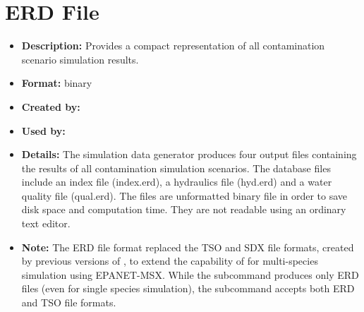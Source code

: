 \section{ERD File}\label{formats_tsoFile} 
\begin{itemize} 
\item {\bfseries Description:} Provides a compact representation of all contamination scenario simulation results. 
\item {\bfseries Format:} binary 
\item {\bfseries Created by:}  
\item {\bfseries Used by:}  
\item {\bfseries Details:} The simulation data generator produces four output files 
containing the results of all contamination simulation scenarios.  The database files include 
an index file (index.erd), a hydraulics file (hyd.erd) and a water quality file (qual.erd).  
The files are unformatted binary file in order to save disk space and computation time. 
They are not readable using an ordinary text editor.  
\item {\bfseries Note:} The ERD file format replaced the TSO and SDX file formats, created by previous versions of 
, to extend the capability of  for multi-species simulation using EPANET-MSX.  
While the  subcommand produces only ERD files 
(even for single species simulation), the  subcommand accepts both ERD and TSO file formats. 
\end{itemize} 


